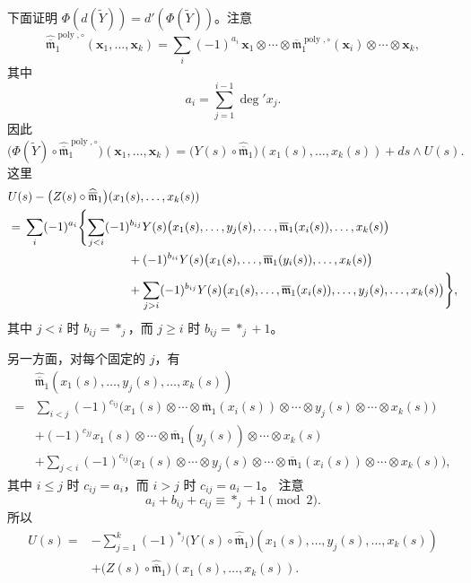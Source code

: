 下面证明 $\Phi(d(\widetilde Y))=d'(\Phi(\widetilde Y))$。注意
\[
 \widehat{\overline{\mathfrak m}}_1^{\operatorname{poly},\circ}
 (\mathbf x_1,\ldots,\mathbf x_k)
 =\sum_i(-1)^{a_i}\,
  \mathbf x_1\otimes\cdots\otimes
  \overline{\mathfrak m}_1^{\operatorname{poly},\circ}(\mathbf x_i)
  \otimes\cdots\otimes\mathbf x_k,
\]
其中
\[
 a_i=\sum_{j=1}^{i-1}\deg' x_j.
\]
因此
\[
 \bigl(\Phi(\widetilde Y)\circ
 \widehat{\overline{\mathfrak m}}_1^{\operatorname{poly},\circ}\bigr)
 (\mathbf x_1,\ldots,\mathbf x_k)
 =\bigl(Y(s)\circ\widehat{\overline{\mathfrak m}}_1\bigr)
  (x_1(s),\ldots,x_k(s))+ds\wedge U(s).
\]
这里
\begingroup\footnotesize
\[
\begin{aligned}
 &U(s)-\bigl(Z(s)\circ\widehat{\overline{\mathfrak m}}_1\bigr)
       (x_1(s),\ldots,x_k(s))\\
 &={}
 \sum_i(-1)^{a_i}\Biggl\{
  \sum_{j<i}(-1)^{b_{ij}}
  Y(s)\bigl(x_1(s),\ldots,y_j(s),\ldots,
             \overline{\mathfrak m}_1(x_i(s)),\ldots,x_k(s)\bigr)\\
 &\hspace{35mm}
  +(-1)^{b_{ii}}
  Y(s)\bigl(x_1(s),\ldots,
             \overline{\mathfrak m}_1(y_i(s)),\ldots,x_k(s)\bigr)\\
 &\hspace{35mm}
  +\sum_{j>i}(-1)^{b_{ij}}
  Y(s)\bigl(x_1(s),\ldots,
             \overline{\mathfrak m}_1(x_i(s)),\ldots,
             y_j(s),\ldots,x_k(s)\bigr)
 \Biggr\},
\end{aligned}
\]
\endgroup
其中 $j<i$ 时 $b_{ij}=*_j$，而 $j\geq i$ 时
$b_{ij}=*_j+1$。

另一方面，对每个固定的 $j$，有
\begingroup\small
\[
\begin{aligned}
 &\widehat{\overline{\mathfrak m}}_1
  (x_1(s),\ldots,y_j(s),\ldots,x_k(s))\\
 ={}&\sum_{i<j}(-1)^{c_{ij}}
  \bigl(x_1(s)\otimes\cdots\otimes
        \overline{\mathfrak m}_1(x_i(s))\otimes\cdots\otimes
        y_j(s)\otimes\cdots\otimes x_k(s)\bigr)\\
 &+(-1)^{c_{jj}}
  x_1(s)\otimes\cdots\otimes
  \overline{\mathfrak m}_1(y_j(s))\otimes\cdots\otimes x_k(s)\\
 &+\sum_{j<i}(-1)^{c_{ij}}
  \bigl(x_1(s)\otimes\cdots\otimes y_j(s)\otimes\cdots\otimes
        \overline{\mathfrak m}_1(x_i(s))\otimes\cdots\otimes x_k(s)\bigr),
\end{aligned}
\]
\endgroup
其中 $i\leq j$ 时 $c_{ij}=a_i$，而 $i>j$ 时
$c_{ij}=a_i-1$。
注意
\[
 a_i+b_{ij}+c_{ij}\equiv *_j+1\pmod 2.
\]
所以
\[
\begin{aligned}
 U(s)={}&-\sum_{j=1}^k(-1)^{*_j}
 \bigl(Y(s)\circ\widehat{\overline{\mathfrak m}}_1\bigr)
 (x_1(s),\ldots,y_j(s),\ldots,x_k(s))\\
 &+\bigl(Z(s)\circ\widehat{\overline{\mathfrak m}}_1\bigr)
 (x_1(s),\ldots,x_k(s)).
\end{aligned}
\]

